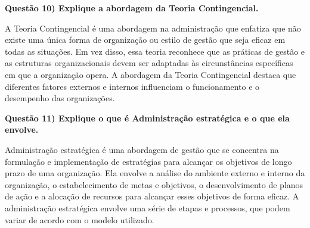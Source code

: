 \documentclass[11pt]{article}
\begin{document}
\noindent \textbf{Questão 10) Explique a abordagem da Teoria Contingencial.}\par
A Teoria Contingencial é uma abordagem na administração que enfatiza que não existe uma única forma de organização ou estilo de gestão que seja eficaz em todas as situações. Em vez disso, essa teoria reconhece que as práticas de gestão e as estruturas organizacionais devem ser adaptadas às circunstâncias específicas em que a organização opera. A abordagem da Teoria Contingencial destaca que diferentes fatores externos e internos influenciam o funcionamento e o desempenho das organizações.\par

\noindent \textbf{Questão 11) Explique o que é Administração estratégica e o que ela envolve.}\par
Administração estratégica é uma abordagem de gestão que se concentra na formulação e implementação de estratégias para alcançar os objetivos de longo prazo de uma organização. Ela envolve a análise do ambiente externo e interno da organização, o estabelecimento de metas e objetivos, o desenvolvimento de planos de ação e a alocação de recursos para alcançar esses objetivos de forma eficaz. A administração estratégica envolve uma série de etapas e processos, que podem variar de acordo com o modelo utilizado.\par
\end{document}

